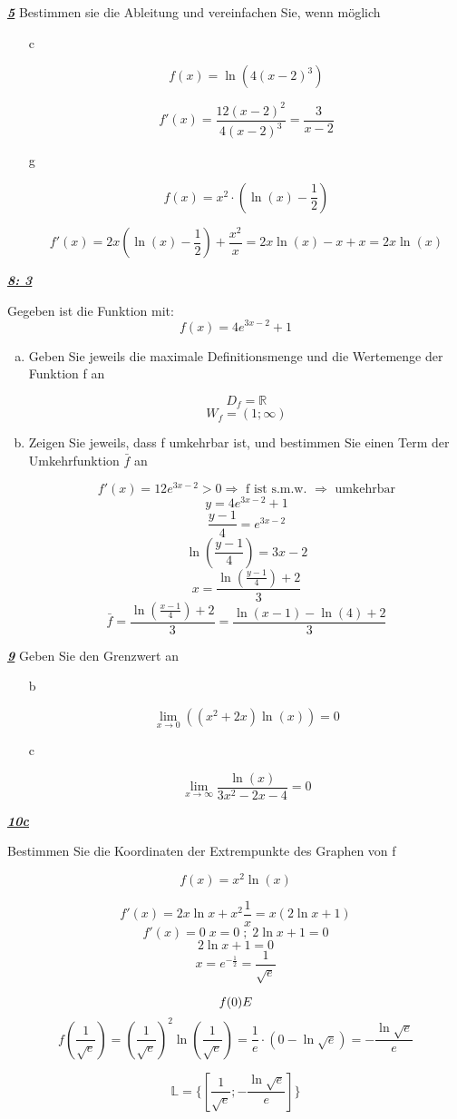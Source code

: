 \documentclass{article}
\begin{document}
\underline{\textit{\textbf{5}}}
Bestimmen sie die Ableitung und vereinfachen Sie, wenn möglich
\begin{enumerate}[a)]
\item[c]

\[f(x) = \ln(4(x-2)^3)\]

\[f'(x) = \frac {12(x-2)^2}{4(x-2)^3} = \frac 3 {x-2}\]

\item[g]

\[f(x) = x^2\cdot (\ln(x) - \frac 12)\]

\[f'(x) = 2x (\ln(x) - \frac 12) + \frac {x^2} x = 2x\ln(x) - x + x = 2x \ln (x)\]
\end{enumerate}

\underline{\textit{\textbf{8: 3}}}

Gegeben ist die Funktion mit:
\[f(x) = 4e^{3x-2}+1\]
\begin{enumerate}[a)]

\item Geben Sie jeweils die maximale Definitionsmenge und die Wertemenge der Funktion f an

\[D_f = \mathbb{R}\]
\[W_f = (1;\infty)\]

\item Zeigen Sie jeweils, dass f umkehrbar ist, und bestimmen Sie einen Term der Umkehrfunktion $\bar f$ an

\[f'(x) = 12 e^{3x-2} > 0 \Rightarrow \text{ f ist s.m.w. } \Rightarrow \text{ umkehrbar}\]
\[y = 4e^{3x-2}+1\]
\[\frac {y-1}4 = e^{3x-2}\]
\[\ln (\frac {y-1}4) = 3x-2\]
\[x = \frac {\ln (\frac {y-1}4) +2}3\]
\[\bar f = \frac {\ln (\frac {x-1}4) +2}3 = \frac {\ln (x-1)-\ln(4) +2}3\]

\end{enumerate}

\underline{\textit{\textbf{9}}}
Geben Sie den Grenzwert an

\begin{enumerate}[a)]
\item[b]

\[ \lim_{x \to 0} ((x^2+2x)\ln(x)) = 0\]

\item[c]

\[ \lim_{x \to \infty} \frac {\ln(x)}{3x^2-2x-4} = 0\]
\end{enumerate}

\underline{\textit{\textbf{10c}}}

Bestimmen Sie die Koordinaten der Extrempunkte des Graphen von f

\[f(x) = x^2\ln(x)\]

\[f'(x) = 2x\ln x + x^2\frac1x = x (2\ln x + 1) \]
\[f'(x) = 0 \; x = 0 \; ; \; 2 \ln x +1 = 0\]
\[2 \ln x +1 = 0\]
\[x = e^{-\frac12} = \frac 1 {\sqrt e}\]

\[f(0) \Lightning\]
\[f(\frac 1 {\sqrt e}) = (\frac 1 {\sqrt e})^2\ln(\frac 1 {\sqrt e}) = \frac 1 e \cdot ( 0 - \ln{\sqrt e}) = -\frac {\ln \sqrt e}{e}\]

\[\mathbb{L} = \{ [\frac 1 {\sqrt e };-\frac {\ln \sqrt e}{e}]\}\]
\end{document}
